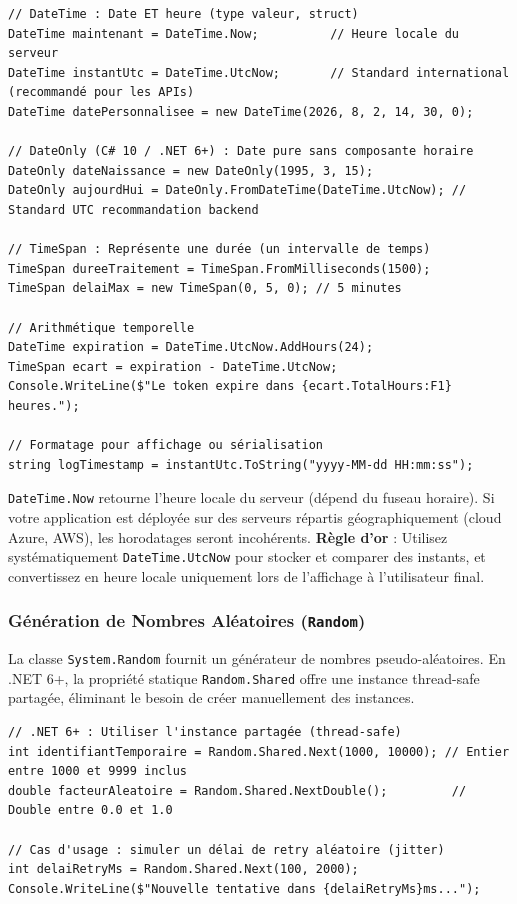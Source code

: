 \begin{lstlisting}[caption={Manipulation des types temporels}]
// DateTime : Date ET heure (type valeur, struct)
DateTime maintenant = DateTime.Now;          // Heure locale du serveur
DateTime instantUtc = DateTime.UtcNow;       // Standard international (recommandé pour les APIs)
DateTime datePersonnalisee = new DateTime(2026, 8, 2, 14, 30, 0);

// DateOnly (C# 10 / .NET 6+) : Date pure sans composante horaire
DateOnly dateNaissance = new DateOnly(1995, 3, 15);
DateOnly aujourdHui = DateOnly.FromDateTime(DateTime.UtcNow); // Standard UTC recommandation backend

// TimeSpan : Représente une durée (un intervalle de temps)
TimeSpan dureeTraitement = TimeSpan.FromMilliseconds(1500);
TimeSpan delaiMax = new TimeSpan(0, 5, 0); // 5 minutes

// Arithmétique temporelle
DateTime expiration = DateTime.UtcNow.AddHours(24);
TimeSpan ecart = expiration - DateTime.UtcNow;
Console.WriteLine($"Le token expire dans {ecart.TotalHours:F1} heures.");

// Formatage pour affichage ou sérialisation
string logTimestamp = instantUtc.ToString("yyyy-MM-dd HH:mm:ss");
\end{lstlisting}

\begin{tcolorbox}[colback=backcolour,colframe=stringcolor,title=\textbf{Piège : \texttt{DateTime.Now} vs \texttt{DateTime.UtcNow}}]
    \texttt{DateTime.Now} retourne l'heure locale du serveur (dépend du fuseau horaire). Si votre application est déployée sur des serveurs répartis géographiquement (cloud Azure, AWS), les horodatages seront incohérents. \textbf{Règle d'or} : Utilisez systématiquement \texttt{DateTime.UtcNow} pour stocker et comparer des instants, et convertissez en heure locale uniquement lors de l'affichage à l'utilisateur final.
\end{tcolorbox}

\subsubsection{Génération de Nombres Aléatoires (\texttt{Random})}

La classe \texttt{System.Random} fournit un générateur de nombres pseudo-aléatoires. En .NET 6+, la propriété statique \texttt{Random.Shared} offre une instance thread-safe partagée, éliminant le besoin de créer manuellement des instances.

\begin{lstlisting}[caption={Génération de nombres aléatoires}]
// .NET 6+ : Utiliser l'instance partagée (thread-safe)
int identifiantTemporaire = Random.Shared.Next(1000, 10000); // Entier entre 1000 et 9999 inclus
double facteurAleatoire = Random.Shared.NextDouble();         // Double entre 0.0 et 1.0

// Cas d'usage : simuler un délai de retry aléatoire (jitter)
int delaiRetryMs = Random.Shared.Next(100, 2000);
Console.WriteLine($"Nouvelle tentative dans {delaiRetryMs}ms...");
\end{lstlisting}

